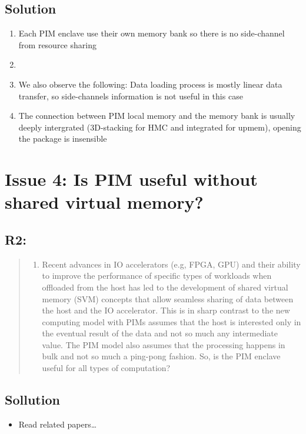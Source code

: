 \documentclass[11pt]{article}
\begin{document}
\subsection{Solution}
\label{sec:org9cb1724}
\begin{enumerate}
\item Each PIM enclave use their own memory bank so there is no side-channel from resource sharing
\item 

\item We also observe the following: Data loading process is mostly linear data transfer, so side-channels information is not useful in this case
\item The connection between PIM local memory and the memory bank is usually deeply intergrated (3D-stacking for HMC and integrated for upmem), opening the package is insensible
\end{enumerate}

\section{Issue 4: Is PIM useful without shared virtual memory?}
\label{sec:orgb11ceb8}
\subsection{R2:}
\label{sec:org4528005}
\begin{quote}
\begin{enumerate}
\item Recent advances in IO accelerators (e.g, FPGA, GPU) and their ability to improve the performance of specific types of workloads when offloaded from the host has led to the development of shared virtual memory (SVM) concepts that allow seamless sharing of data between the host and the IO accelerator. This is in sharp contrast to the new computing model with PIMs assumes that the host is interested only in the eventual result of the data and not so much any intermediate value. The PIM model also assumes that the processing happens in bulk and not so much a ping-pong fashion. So, is the PIM enclave useful for all types of computation?
\end{enumerate}
\end{quote}
\subsection{Sollution}
\label{sec:org838cb90}
\begin{itemize}
\item Read related papers\ldots{}
\end{itemize}
\end{document}
